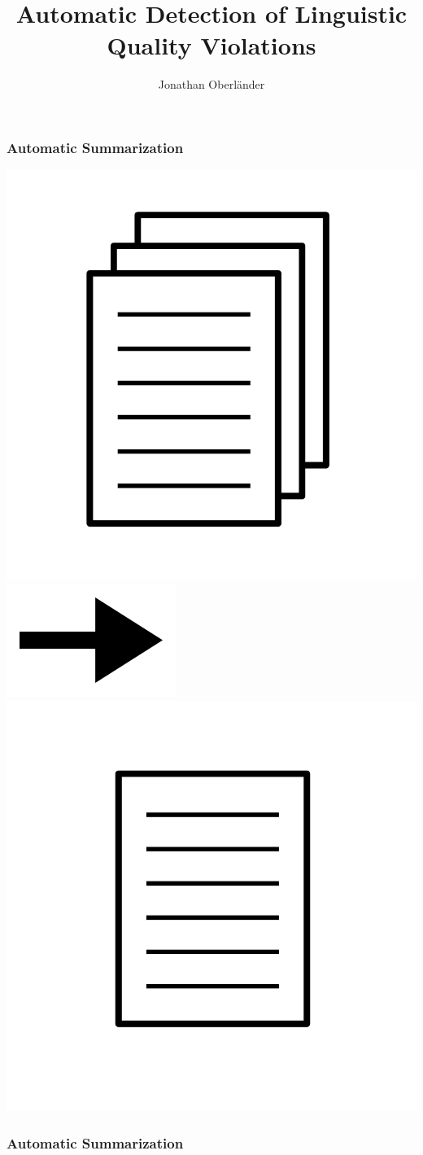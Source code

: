 \documentclass[table]{beamer}
\author{Jonathan Oberländer}
\title[Automatic Detection of LQ Violations\hspace{8em}\insertframenumber]{Automatic Detection of Linguistic Quality Violations} %
\date{}
\institute{Bachelor Thesis Defense\\Universität des Saarlandes\\21.08.2014}
\begin{document}
\maketitle


\begin{frame}
  \frametitle{Automatic Summarization}
  \quad \quad \includegraphics[scale=0.1]{pics/documents.png} \includegraphics[scale=1]{pics/arrowlr.png} \includegraphics[scale=0.1]{pics/document.png}
\end{frame}

\begin{frame}
  \frametitle{Automatic Summarization}
\end{frame}
\end{document}
